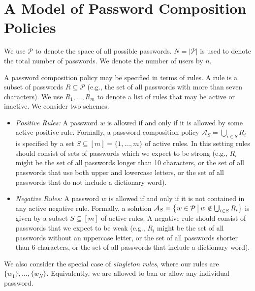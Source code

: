 \documentclass[prodmode,acmec]{ec-acmsmall}
\newcommand{\PasswordSpace}{\mathcal{P}}
\begin{document}
\section{A Model of Password Composition Policies} \label{sec:Models}

We use $\PasswordSpace$ to denote the space of all possible passwords. $N = \left| \PasswordSpace\right|$ is used to denote the total number of passwords. We denote the number of users by $n$.

A password composition policy may be specified in terms of rules. A rule is a subset of passwords $R \subseteq \PasswordSpace$ (e.g., the set of all passwords with more than seven characters). We use $R_1,...,R_m$ to denote a list of rules that may be active or inactive. We consider two schemes. 

\begin{itemize}
\item {\em Positive Rules: } A password $w$ is allowed if and only if it is allowed by some active positive rule. Formally, a password composition policy  $\mathcal{A}_S = \bigcup_{i \in S} R_i$
is specified by a set $S \subseteq [m] = \{1,...,m\}$ of active rules. In this setting rules should consist of sets of passwords which we expect to be strong (e.g., $R_i$ might be the set of all passwords longer than 10 characters, or the set of all passwords that use both upper and lowercase letters, or the set of all passwords that do not include a dictionary word). 

\item {\em Negative Rules:} A password $w$ is allowed if and only if it is not contained in any active negative rule. Formally, a solution  $\mathcal{A}_S = \left\{w \in \PasswordSpace ~\vline~w \notin \bigcup_{i \in S} R_i \right\}$ is given by a subset $S \subseteq [m]$ of active rules. A negative rule should consist of passwords that we expect to be weak (e.g., $R_i$ might be the set of all passwords without an uppercase letter, or the set of all passwords shorter than 6 characters, or the set of all passwords that include a dictionary word). 
\end{itemize}

We also consider the special case of \emph{singleton rules}, where our rules are $\{w_1\},\ldots,\{w_N\}$. Equivalently, we are allowed to ban or allow any individual password. 
\end{document}
